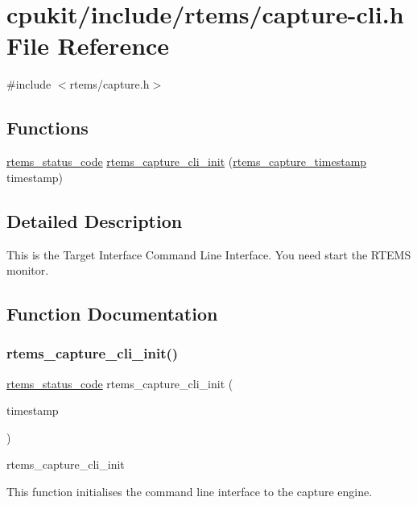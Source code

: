 \hypertarget{capture-cli_8h}{}\section{cpukit/include/rtems/capture-\/cli.h File Reference}
\label{capture-cli_8h}
{\ttfamily \#include $<$rtems/capture.\+h$>$}\newline
\subsection*{Functions}
\begin{DoxyCompactItemize}
\item 
\mbox{\hyperlink{group__ClassicStatus_ga545d41846817eaba6143d52ee4d9e9fe}{rtems\+\_\+status\+\_\+code}} \mbox{\hyperlink{capture-cli_8h_a0cc8297e7b9d63e4a6cc41412a301941}{rtems\+\_\+capture\+\_\+cli\+\_\+init}} (\mbox{\hyperlink{group__libmisc__capture_gab70845b819ef4c8c57f4f46ce276f0dd}{rtems\+\_\+capture\+\_\+timestamp}} timestamp)
\end{DoxyCompactItemize}


\subsection{Detailed Description}
This is the Target Interface Command Line Interface. You need start the R\+T\+E\+MS monitor. 

\subsection{Function Documentation}
\mbox{\label{capture-cli_8h_a0cc8297e7b9d63e4a6cc41412a301941}} 
\subsubsection{\texorpdfstring{rtems\_capture\_cli\_init()}{rtems\_capture\_cli\_init()}}
{\footnotesize\ttfamily \mbox{\hyperlink{group__ClassicStatus_ga545d41846817eaba6143d52ee4d9e9fe}{rtems\+\_\+status\+\_\+code}} rtems\+\_\+capture\+\_\+cli\+\_\+init (\begin{DoxyParamCaption}\item[{\mbox{\hyperlink{group__libmisc__capture_gab70845b819ef4c8c57f4f46ce276f0dd}{rtems\+\_\+capture\+\_\+timestamp}}}]{timestamp }\end{DoxyParamCaption})}

rtems\+\_\+capture\+\_\+cli\+\_\+init

This function initialises the command line interface to the capture engine. 